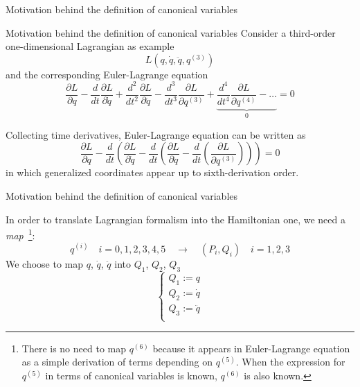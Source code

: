 \begin{frame}{Motivation behind the definition of canonical variables}
  \begin{alertblock}{Motivation behind the definition of canonical variables}
    \vspace{0.5em}
    Consider a third-order one-dimensional Lagrangian as example
    \begin{equation*}
      L\left( q, \dot{q}, \ddot{q}, q^{(3)} \right)
    \end{equation*}
    and the corresponding Euler-Lagrange equation
    \begin{equation*} \label{eq:third_order_euler_lagrangian}
      \frac{\partial L}{\partial q} -
      \frac{d}{dt}\frac{\partial L}{\partial \dot{q}} +
      \frac{d^2}{dt^2}\frac{\partial L}{\partial \ddot{q}} -
      \frac{d^3}{dt^3}\frac{\partial L}{\partial q^{(3)}} +
      \underbrace{
      \frac{d^4}{dt^4}\frac{\partial L}{\partial q^{(4)}} - \ldots }_0 = 0
    \end{equation*}

    Collecting time derivatives, Euler-Lagrange equation can be written as
    \begin{equation*} \label{eq:third_order_euler_lagrangian_with_parts}
      \frac{\partial L}{\partial q} -
      \frac{d}{dt} \left(
      \frac{\partial L}{\partial \dot{q}} -
      \frac{d}{dt} \left(
      \frac{\partial L}{\partial \ddot{q}} -
      \frac{d}{dt} \left(
      \frac{\partial L}{\partial q^{(3)}}
      \right)\right)\right) = 0
    \end{equation*}
    in which generalized coordinates appear up to sixth-derivation order.
  \end{alertblock}
\end{frame}

\begin{frame}{Motivation behind the definition of canonical variables}
  \begin{alertblock}{}
    In order to translate Lagrangian formalism into the Hamiltonian one, we
    need a \emph{map}~\footnote{
      There is no need to map $q^{(6)}$ because it appears in Euler-Lagrange
      equation as a simple derivation of terms depending on $q^{(5)}$. When
      the expression for $q^{(5)}$ in terms of canonical variables is known,
      $q^{(6)}$ is also known.
    }:
    \begin{equation*}
      q^{(i)} \quad i = 0, 1, 2, 3, 4, 5
      \quad \longrightarrow \quad
      (P_i , Q_i) \quad i = 1, 2, 3
    \end{equation*}
    We choose to map $q$, $\dot{q}$, $\ddot{q}$ into $Q_1$, $Q_2$, $Q_3$
    \begin{equation*}\label{eq:def_Q}
      \begin{cases}
        Q_1 := q \\
        Q_2 := \dot{q} \\
        Q_3 := \ddot{q} \\
      \end{cases}
    \end{equation*}
  \end{alertblock}
\end{frame}

